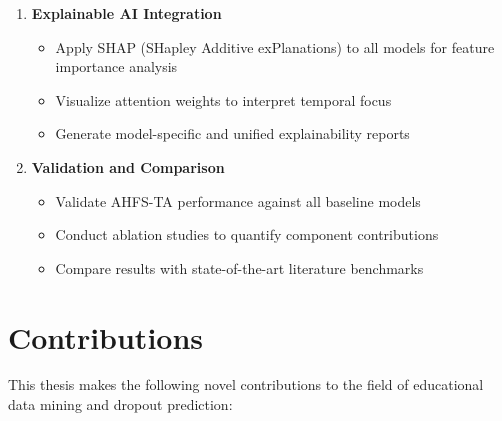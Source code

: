 \begin{enumerate}
    \item \textbf{Explainable AI Integration}
    \begin{itemize}
        \item Apply SHAP (SHapley Additive exPlanations) to all models for feature importance analysis
        \item Visualize attention weights to interpret temporal focus
        \item Generate model-specific and unified explainability reports
    \end{itemize}
    
    \item \textbf{Validation and Comparison}
    \begin{itemize}
        \item Validate AHFS-TA performance against all baseline models
        \item Conduct ablation studies to quantify component contributions
        \item Compare results with state-of-the-art literature benchmarks
    \end{itemize}
\end{enumerate}

\section{Contributions}

This thesis makes the following novel contributions to the field of educational data mining and dropout prediction:

